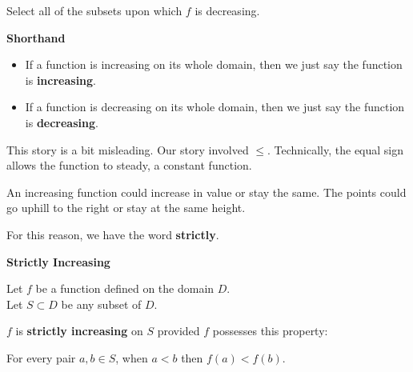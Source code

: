 \documentclass{ximera}
\begin{document}
\begin{example}
\begin{question}

Select all of the subsets upon which $f$ is decreasing.


\begin{selectAll}
\choice [correct]{$[-2,6)$}
\choice [correct]{$[6,8]$}
\end{selectAll}
\end{question}





\end{example}




\begin{remark} \textbf{\textcolor{yellow!35!black}{Shorthand}}

  \begin{itemize}
    \item If a function is increasing on its whole domain, then we just say the function is \textbf{increasing}.
    \item If a function is decreasing on its whole domain, then we just say the function is \textbf{decreasing}.
  \end{itemize}
\end{remark}




This story is a bit misleading.  Our story involved $\leq$.  Technically, the equal sign allows the function to steady, a constant function. 

An increasing function could increase in value or stay the same.  The points could go uphill to the right or stay at the same height. 

For this reason, we have the word \textbf{strictly}.








\begin{definition} \textbf{\textcolor{green!50!black}{Strictly Increasing}} 


Let $f$ be a function defined on the domain $D$. \\
Let $S \subset D$ be any subset of $D$.

$f$ is \textbf{strictly increasing} on $S$ provided $f$ possesses this property:  


\begin{center}
For every pair $a, b \in S$, when $a < b$ then $f(a) < f(b)$.
\end{center}

\end{definition}
\end{document}
